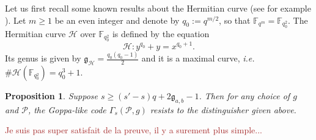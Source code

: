 \documentclass[a4paper]{article}
\newtheorem{proposition}[thm]{Proposition}
\theoremstyle{definition}
\theoremstyle{remark}
\newcommand{\calP}{\mathcal{P}}
\newcommand{\calH}{\mathcal{H}}
\newcommand{\fqm}{\mathbb{F}_{q^m}}
\newcommand{\fqo}{\mathbb{F}_{q_0^2}}
\newcommand\mathieu[1]{\textcolor{brown}{#1}}
\begin{document}
\noindent Let us first recall some known results about the Hermitian curve (see for example \cite{Sti09}). Let $m \geq 1$  be an even integer and denote by $q_0 := q^{m/2}$, so that $\fqm = \fqo$. The Hermitian curve $\calH$ over $\fqo$ is defined by the equation
$$\calH : y^{q_0}+y = x^{q_0+1}.$$
Its genus is given by $\mathfrak{g}_{\calH} = \frac{q_0(q_0-1)}{2}$ and it is a maximal curve, \emph{i.e.} $\#\calH(\fqo) = q_0^3+1$.


\begin{proposition} \label{prop:Hermitian_Goppa_like_are_secured}
    Suppose $s \geq (s'-s)q+2\mathfrak{g}_{a,b}-1$. Then for any choice of $g$ and $\calP$, the Goppa-like code $\Gamma_s(\calP,g)$ resists to the distinguisher given above.
\end{proposition}

\mathieu{Je suis pas super satisfait de la preuve, il y a surement plus simple...}
\end{document}
